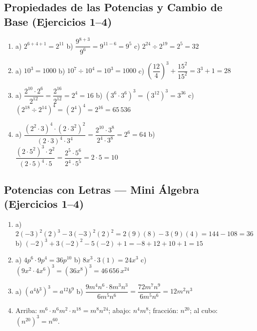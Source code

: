 \documentclass[12pt, letterpaper]{article}
\begin{document}
  \subsection*{Propiedades de las Potencias y Cambio de Base (Ejercicios 1--4)}

  \begin{enumerate}[leftmargin=*, label=\textbf{\arabic*.}]
    \item a) $2^{6+4+1} = 2^{11}$ \quad b) $\dfrac{9^{8+3}}{9^{6}} = 9^{11-6} = 9^{5}$ \quad c) $2^{24} \div 2^{19} = 2^{5} = 32$
    \item a) $10^{3} = 1000$ \quad b) $10^{7} \div 10^{4} = 10^{3} = 1000$ \quad c) $\left(\dfrac{12}{4}\right)^{3} + \dfrac{15^{2}}{15^{2}} = 3^{3} + 1 = 28$
    \item a) $\dfrac{2^{10} \cdot 2^{6}}{2^{12}} = \dfrac{2^{16}}{2^{12}} = 2^{4} = 16$ \quad b) $(3^{6} \cdot 3^{6})^{3} = (3^{12})^{3} = 3^{36}$ \quad c) $(2^{18} \div 2^{14})^{4} = (2^{4})^{4} = 2^{16} = 65\,536$
    \item a) $\dfrac{(2^{2} \cdot 3)^{4} \cdot (2 \cdot 3^{2})^{2}}{(2 \cdot 3)^{4} \cdot 3^{4}} = \dfrac{2^{10} \cdot 3^{8}}{2^{4} \cdot 3^{8}} = 2^{6} = 64$
          \quad b) $\dfrac{(2 \cdot 5^{2})^{3} \cdot 2^{2}}{(2 \cdot 5)^{4} \cdot 5} = \dfrac{2^{5} \cdot 5^{6}}{2^{4} \cdot 5^{5}} = 2 \cdot 5 = 10$
  \end{enumerate}

  \subsection*{Potencias con Letras — Mini Álgebra (Ejercicios 1--4)}

  \begin{enumerate}[leftmargin=*, label=\textbf{\arabic*.}]
    \item a) $2(-3)^{2}(2)^{3} - 3(-3)^{2}(2)^{2} = 2(9)(8) - 3(9)(4) = 144 - 108 = 36$
          \quad b) $(-2)^{3} + 3(-2)^{2} - 5(-2) + 1 = -8 + 12 + 10 + 1 = 15$
    \item a) $4p^{6} \cdot 9p^{4} = 36p^{10}$ \quad b) $8x^{3} \cdot 3(1) = 24x^{3}$ \quad c) $(9x^{2} \cdot 4x^{6})^{3} = (36x^{8})^{3} = 46\,656\,x^{24}$
    \item a) $\left(a^{4}b^{3}\right)^{3} = a^{12}b^{9}$ \quad b) $\dfrac{9m^{4}n^{6} \cdot 8m^{3}n^{3}}{6m^{5}n^{6}} = \dfrac{72m^{7}n^{9}}{6m^{5}n^{6}} = 12m^{2}n^{3}$
    \item Arriba: $m^{6} \cdot n^{6}m^{2} \cdot n^{18} = m^{8}n^{24}$; abajo: $n^{4}m^{8}$; fracción: $n^{20}$; al cubo: $(n^{20})^{3} = n^{60}$.
  \end{enumerate}
\end{document}
